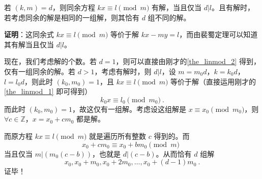 \begin{theorem}{}
若 $(k, m) = d$，则同余方程 $kx \equiv l \pmod m$ 有解，当且仅当 $d | l$。且有解时，若考虑同余的解是相同的一组解，则其恰有 $d$ 组不同的解。
\end{theorem}
\textbf{证明}：这同余式 $kx \equiv l \pmod m$ 等价于解 $kx - my = l$，而由裴蜀定理可以知道其有解当且仅当 $d | l$。

现在，我们考虑解的个数。若 $d=1$，则可以直接由刚才的\autoref{the_linmod_2} 得到，仅有一组同余的解。若 $d > 1$，考虑有解时，则 $d|l$，设 $m = m_0 d$，$k = k_0 d$，$l = l_0 d$，则此时 $(k_0, m_0) = 1$，且 $kx \equiv l \pmod m$ 等价于解（直接运用刚才的\autoref{the_linmod_1} 即可得到）
\begin{equation}
k_0 x \equiv l_0 \pmod {m_0} ~.
\end{equation}
而此时 $(k_0, m_0) = 1$，故这仅有一组解。考虑设这组解是 $x \equiv x_0 \pmod {m_0}$，则 $\forall c \in \mathbb Z$，$x = x_0 + c m_0$ 都是解。

而原方程 $kx \equiv l \pmod m$ 就是遍历所有整数 $c$ 得到的。而
\begin{equation}
x_0 + c m_0 \equiv x_0 + b m_0 \pmod m ~~
\end{equation}
当且仅当 $m | (m_0 (c - b))$，也就是 $d | (c - b)$。从而恰有 $d$ 组解
\begin{equation}
x_0, x_0 + m_0, x_0 + 2 m_0, \dots, x_0 + (d-1) m_0 ~.
\end{equation}
证毕！